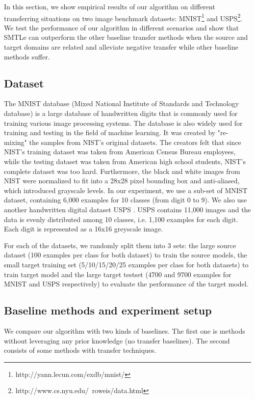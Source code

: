 In this section, we show empirical results of our algorithm on different transferring situations on two image benchmark datasets: MNIST\footnote{http://yann.lecun.com/exdb/mnist/} \cite{lampert2009learning} and USPS\footnote{http://www.cs.nyu.edu/~roweis/data.html}. We test the performance of our algorithm in different scenarios and show that SMTLe can outperform the other baseline transfer methods when the source and target domains are related and alleviate negative transfer while other baseline methods suffer.
\subsection{Dataset}
The MNIST database \cite{lecun1998gradient} (Mixed National Institute of Standards and Technology database) is a large database of handwritten digits that is commonly used for training various image processing systems. The database is also widely used for training and testing in the field of machine learning. It was created by "re-mixing" the samples from NIST's original datasets. The creators felt that since NIST's training dataset was taken from American Census Bureau employees, while the testing dataset was taken from American high school students, NIST's complete dataset was too hard. Furthermore, the black and white images from NIST were normalized to fit into a 28x28 pixel bounding box and anti-aliased, which introduced grayscale levels. In our experiment, we use a sub-set of MNIST dataset, containing 6,000 examples for 10 classes (from digit 0 to 9). We also use another handwritten digital dataset USPS \cite{hull1994database}. USPS contains 11,000 images and the data is evenly distributed among 10 classes, i.e. 1,100 examples for each digit. Each digit is represented as a 16x16 greyscale image.
 
For each of the datasets, we randomly split them into 3 sets: the large source dataset (100 examples per class for both dataset) to train the source models, the small target training set (5/10/15/20/25 examples per class for both datasets) to train target model and the large target testset (4700 and 9700 examples for MNIST and USPS respectively) to evaluate the performance of the target model.

\subsection{Baseline methods and experiment setup}
We compare our algorithm with two kinds of baselines. The first one is methods without leveraging any prior knowledge (no transfer baselines). The second consists of some methods with transfer techniques. 

